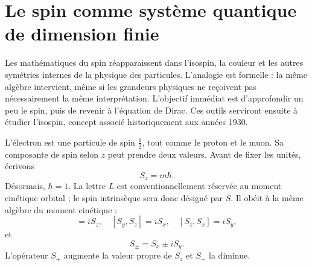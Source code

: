\begin{classroomqa}\end{classroomqa}

\section{Le spin comme système quantique de dimension finie}

Les mathématiques du spin réapparaissent dans l’isospin, la couleur et les autres symétries internes de la physique des particules. L’analogie est formelle : la même algèbre intervient, même si les grandeurs physiques ne reçoivent pas nécessairement la même interprétation. L’objectif immédiat est d’approfondir un peu le spin, puis de revenir à l’équation de Dirac. Ces outils serviront ensuite à étudier l’isospin, concept associé historiquement aux années 1930.

L’électron est une particule de spin \(\tfrac12\), tout comme le proton et le muon. Sa composante de spin selon \(z\) peut prendre deux valeurs. Avant de fixer les unités, écrivons
\begin{equation}
S_z=m\hbar.
\end{equation}
Désormais, \(\hbar=1\). La lettre \(L\) est conventionnellement réservée au moment cinétique orbital ; le spin intrinsèque sera donc désigné par \(S\). Il obéit à la même algèbre du moment cinétique :
\begin{equation}
[S_x,S_y]=iS_z,
\quad
[S_y,S_z]=iS_x,
\quad
[S_z,S_x]=iS_y,
\end{equation}
et
\begin{equation}
S_\pm=S_x\pm iS_y.
\end{equation}
L’opérateur \(S_+\) augmente la valeur propre de \(S_z\) et \(S_-\) la diminue.

\begin{classroomqa}\end{classroomqa}

